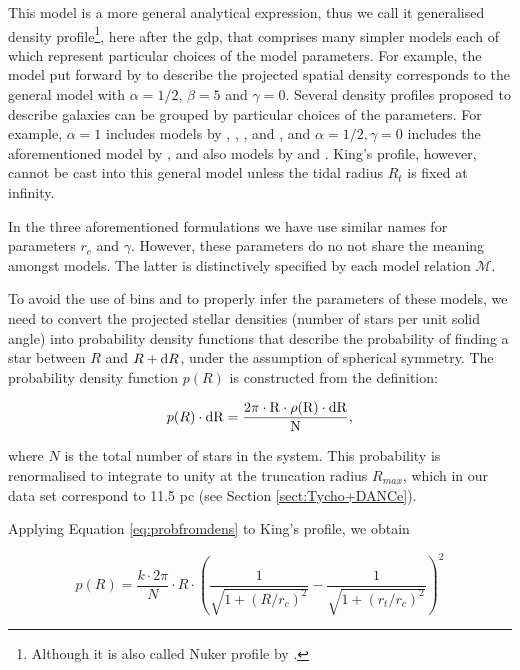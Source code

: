 This model is a more general analytical expression, thus we call it generalised density profile\footnote{Although it is also called Nuker profile by \citet{2010MNRAS.407.2241K}.}, here after the  \gls{gdp}, that comprises many
simpler models each of which represent particular choices of the model
parameters. For example, the model put forward by
\cite{1911MNRAS..71..460P} to describe the projected spatial density
corresponds to the general model with $\alpha=1/2$, $\beta=5$ and
$\gamma=0$. Several density profiles proposed to describe galaxies can
be grouped by particular choices of the parameters. For example,
$\alpha=1$ includes models by \cite{1997ApJ...490..493N},
\cite{1990ApJ...356..359H}, \cite{1983MNRAS.202..995J}, and
\cite{1999MNRAS.310.1147M}, and $\alpha=1/2, \gamma=0$ includes the
aforementioned model by \cite{1911MNRAS..71..460P}, and also models by
\cite{1990ApJ...361..408S} and \cite{1985MNRAS.216..273D}. King's
profile, however, cannot be cast into this general model unless the
tidal radius $R_t$ is fixed at infinity. 

In the three aforementioned formulations we have use similar names for parameters $r_c$ and $\gamma$. However,
these parameters do no not share the meaning amongst models. The latter is
distinctively specified by each model relation $\mathcal{M}$. 

To avoid the use of bins and to properly infer the parameters of these models, we need to convert the projected stellar densities
(number of stars per unit solid angle) into probability density
functions that describe the probability of finding a star between $R$
and $R+{\rm d}R$, under the assumption of spherical symmetry. The probability density function $p(R)$ is constructed from the
definition:

\begin{equation}
p(R)\cdot \rm{d}R=\frac{2\pi\cdot R \cdot \rho(R)\cdot \rm{d}R}{N},
\label{eq:probfromdens}
\end{equation}

where $N$ is the total number of stars in the system. This probability is renormalised to integrate to unity at the truncation radius $R_{max}$, 
which in our data set correspond to 11.5 pc (see Section \ref{sect:Tycho+DANCe}).

Applying Equation \ref{eq:probfromdens} to King's profile, we obtain

\begin{equation}
  p(R)=\frac{k\cdot2\pi}{N}\cdot R \cdot
  \left(\frac{1}{\sqrt{1+(R/r_c)^2}} - \frac{1}{\sqrt{1+(r_t/r_c)^2}}\right)^2
\end{equation}

